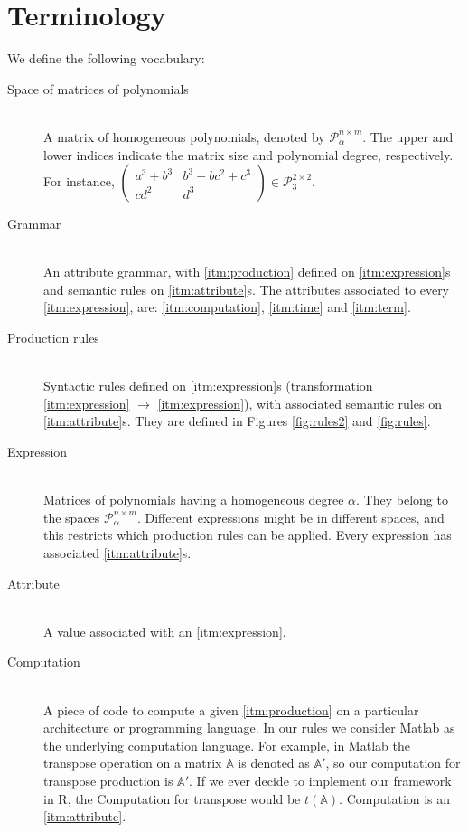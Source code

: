 \section{Terminology}
We define the following vocabulary: 
\vspace{-2mm}
\begin{description}
  \item[Space of matrices of polynomials\label{itm:spacematrices}] \hfill \\ A matrix of homogeneous polynomials, denoted by $\mathcal{P}^{n \times m}_{\alpha}$. The upper and lower indices indicate the matrix size and polynomial degree, respectively. For instance, $\begin{pmatrix} a^3 + b^3 & b^3 + bc^2 + c^3\\ cd^2 & d^3 \end{pmatrix} \in \mathcal{P}^{2 \times 2}_3$. 

\item[Grammar\label{itm:grammar}] \hfill \\ An attribute grammar, with \ref{itm:production} defined on \ref{itm:expression}s and semantic rules on \ref{itm:attribute}s. The attributes associated to every \ref{itm:expression}, are: \ref{itm:computation}, \ref{itm:time} and \ref{itm:term}.

\item[Production rules\label{itm:production}] \hfill \\ Syntactic rules defined on \ref{itm:expression}s (transformation \ref{itm:expression} $\rightarrow$ \ref{itm:expression}), with associated semantic rules on \ref{itm:attribute}s. They are defined in Figures \ref{fig:rules2} and \ref{fig:rules}.

\item[Expression\label{itm:expression}] \hfill \\ Matrices of polynomials having a homogeneous degree $\alpha$. They belong to the spaces $\mathcal{P}^{n \times m}_\alpha$. Different expressions might be in different spaces, and this restricts which production rules can be applied. Every expression has associated \ref{itm:attribute}s.

\item[Attribute\label{itm:attribute}] \hfill \\
  A value associated with an \ref{itm:expression}. 

\item[Computation\label{itm:computation}] \hfill \\ A piece of code to compute a given \ref{itm:production} on a particular architecture or programming language. In our rules we consider Matlab as
the underlying computation language. For example, in Matlab the transpose
  operation on a matrix $\mathbb{A}$ is denoted as $\mathbb{A}'$, so our computation
  for transpose production is $\mathbb{A}'$. If we ever decide to implement our framework in R,
  the Computation for transpose would be $t(\mathbb{A})$. Computation is an \ref{itm:attribute}.


\end{description}
